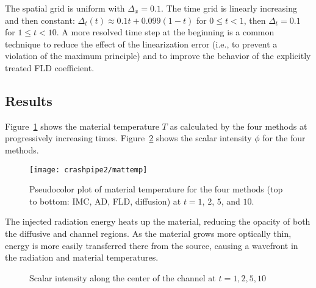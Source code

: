 \documentclass[11pt,letter,twoside]{mc2011}
\begin{document}
The spatial grid is uniform with $\Delta_x=0.1$. The time grid is linearly
increasing and then constant: $\Delta_t(t)\approx 0.1 t + 0.099 (1 - t)$ for $0
\le t < 1$, then $\Delta_t=0.1$ for $1 \le t < 10$. A more resolved time step at
the beginning is a common technique to reduce the effect of the linearization
error (i.e., to prevent a violation of the maximum principle) and to improve
the behavior of the explicitly treated FLD coefficient.

\subsection{Results}
Figure~\ref{fig:mattemp2d} shows the material temperature $T$ as calculated
by the four methods at progressively increasing times. Figure~\ref{fig:phi}
shows the scalar intensity $\phi$ for the four methods.
%
\begin{figure}[htb]
  \centering
  \texttt{[image: crashpipe2/mattemp]}
  \caption{Pseudocolor plot of material temperature for the four methods (top
  to bottom: IMC, AD, FLD, diffusion) at $t=1$, $2$, $5$, and $10$.}
  \label{fig:mattemp2d}
\end{figure}
%
The injected radiation energy heats up the material, reducing the opacity of
both the diffusive and channel regions. As the material grows more optically
thin, energy is more easily transferred there from the source, causing a
wavefront in the radiation and material temperatures.

\begin{figure}[htb]
  \centering
  \hspace{-1.25in}
  \subfigure[$t=1.0$]{
  \small}
  \hspace{-.4in}
  \subfigure[$t=2.0$]{
  \small}
  \hspace{-1.25in}

  \hspace{-1.25in}
  \subfigure[$t=5.0$]{
  \small}
  \hspace{-.4in}
  \subfigure[$t=10.0$]{
  \small}
  \hspace{-1.25in}
  \caption{Scalar intensity along the center of the channel at $t=1,2,5,10$}
  \label{fig:phi}
\end{figure}
\end{document}

